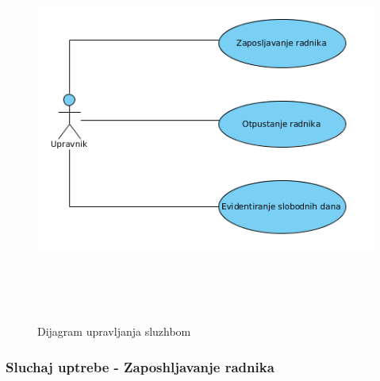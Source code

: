 \documentclass[10 pt]{article}
\begin{document}
	\begin{figure}[H]
		\centering
		\includegraphics[width=12cm,height=12cm,keepaspectratio]{slike/UCUpravljanjeSluzbom.png}\\
		\caption{Dijagram upravljanja sluzhbom}
	\end{figure}
	
	\subsubsection{Sluchaj uptrebe - Zaposhljavanje radnika}
		
\end{document}
